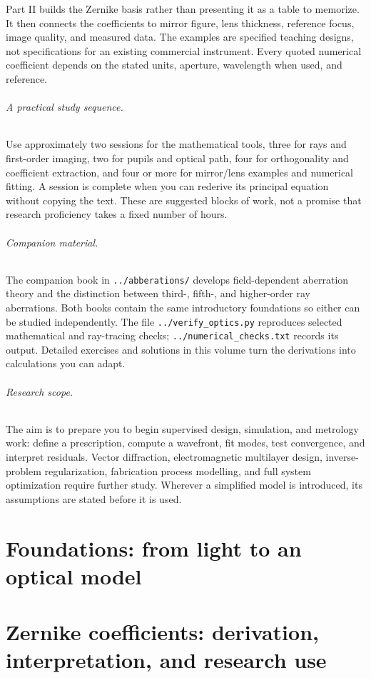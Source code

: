 \documentclass[11pt,a4paper,oneside,openany]{book}
\begin{document}
Part II builds the Zernike basis rather than presenting it as a table to memorize. It then connects the coefficients to mirror figure, lens thickness, reference focus, image quality, and measured data. The examples are specified teaching designs, not specifications for an existing commercial instrument. Every quoted numerical coefficient depends on the stated units, aperture, wavelength when used, and reference.

\paragraph{A practical study sequence.}
Use approximately two sessions for the mathematical tools, three for rays and first-order imaging, two for pupils and optical path, four for orthogonality and coefficient extraction, and four or more for mirror/lens examples and numerical fitting. A session is complete when you can rederive its principal equation without copying the text. These are suggested blocks of work, not a promise that research proficiency takes a fixed number of hours.

\paragraph{Companion material.}
The companion book in \texttt{../abberations/} develops field-dependent aberration theory and the distinction between third-, fifth-, and higher-order ray aberrations. Both books contain the same introductory foundations so either can be studied independently. The file \texttt{../verify\_optics.py} reproduces selected mathematical and ray-tracing checks; \texttt{../numerical\_checks.txt} records its output. Detailed exercises and solutions in this volume turn the derivations into calculations you can adapt.

\paragraph{Research scope.}
The aim is to prepare you to begin supervised design, simulation, and metrology work: define a prescription, compute a wavefront, fit modes, test convergence, and interpret residuals. Vector diffraction, electromagnetic multilayer design, inverse-problem regularization, fabrication process modelling, and full system optimization require further study. Wherever a simplified model is introduced, its assumptions are stated before it is used.


\tableofcontents
\mainmatter
\part{Foundations: from light to an optical model}

\part{Zernike coefficients: derivation, interpretation, and research use}

\end{document}
